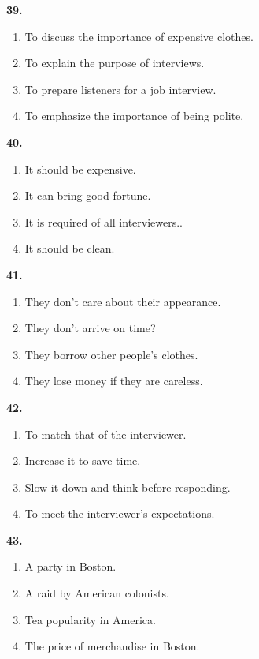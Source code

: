 \documentclass[12pt]{article}
\begin{document}
\noindent\textbf{39.}
\begin{enumerate}[label=(\Alph*),leftmargin=*,itemsep=0.2em]
\item To discuss the importance of expensive clothes.
\item To explain the purpose of interviews.
\item To prepare listeners for a job interview.
\item To emphasize the importance of being polite.
\end{enumerate}
\par
\vspace{0.25\baselineskip}
\noindent\textbf{40.}
\begin{enumerate}[label=(\Alph*),leftmargin=*,itemsep=0.2em]
\item It should be expensive.
\item It can bring good fortune.
\item It is required of all interviewers..
\item It should be clean.
\end{enumerate}
\par
\vspace{0.25\baselineskip}
\noindent\textbf{41.}
\begin{enumerate}[label=(\Alph*),leftmargin=*,itemsep=0.2em]
\item They don't care about their appearance.
\item They don't arrive on time?
\item They borrow other people's clothes.
\item They lose money if they are careless.
\end{enumerate}
\par
\vspace{0.25\baselineskip}
\noindent\textbf{42.}
\begin{enumerate}[label=(\Alph*),leftmargin=*,itemsep=0.2em]
\item To match that of the interviewer.
\item Increase it to save time.
\item Slow it down and think before responding.
\item To meet the interviewer's expectations.
\end{enumerate}
\par
\vspace{0.25\baselineskip}
\noindent\textbf{43.}
\begin{enumerate}[label=(\Alph*),leftmargin=*,itemsep=0.2em]
\item A party in Boston.
\item A raid by American colonists.
\item Tea popularity in America.
\item The price of merchandise in Boston.
\end{enumerate}
\end{document}
